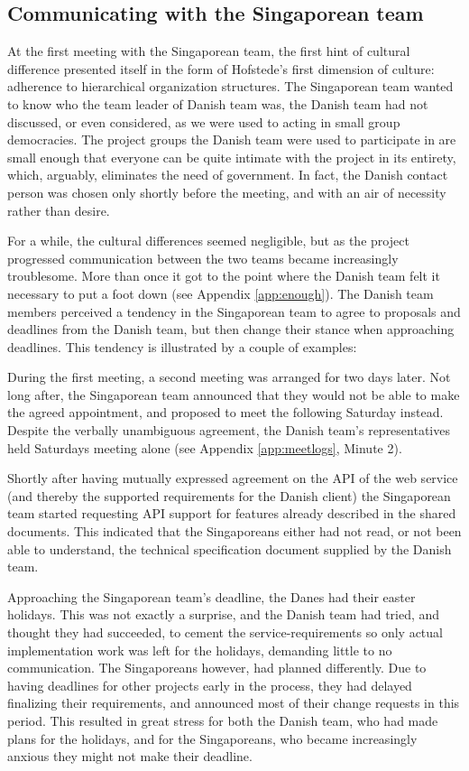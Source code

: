 \subsection{Communicating with the Singaporean team}
\label{sec:communicating}

At the first meeting with the Singaporean team, the first hint of
cultural difference presented itself in the form of Hofstede's first dimension
of culture: adherence to hierarchical organization structures\cite{surprises}.
The Singaporean team wanted to know who the team leader of Danish team was,
the Danish team had not discussed, or even considered, as
we were used to acting in small group democracies. The
project groups the Danish team were used to participate in are small enough
that everyone can be quite intimate with the project in its entirety, which,
arguably, eliminates the need of government. In fact, the Danish contact
person was chosen only shortly before the meeting, and with an air of necessity
rather than desire.

For a while, the cultural differences seemed negligible, but as the project
progressed communication between the two teams became increasingly troublesome.
More than once it got to the point where the Danish team felt it necessary to
put a foot down (see Appendix \ref{app:enough}). The Danish team members perceived a tendency
in the Singaporean team to agree to
proposals and deadlines from the Danish team, but then change their stance when
approaching deadlines. This tendency is illustrated by a couple of examples:

During the first meeting, a second meeting was arranged for two days later. Not
long after, the Singaporean team announced that they would not be able to make
the agreed appointment, and proposed to meet the following Saturday instead.
Despite the verbally unambiguous agreement, the Danish team's
representatives held Saturdays meeting alone (see Appendix \ref{app:meetlogs},
Minute 2).

Shortly after having mutually expressed
agreement on the API of the web service (and thereby the supported requirements
for the Danish client) the Singaporean team started requesting API support for
features already described in the shared documents.
This indicated that the Singaporeans either had not read, or not been able to
understand, the technical specification document supplied by the Danish team.

Approaching the Singaporean team's deadline, the Danes had their easter
holidays. This was not exactly a surprise, and the Danish team had tried, and
thought they had succeeded, to cement the service-requirements so only actual
implementation work was left for the holidays, demanding little to no
communication. The Singaporeans however, had planned differently. Due to having
deadlines for other projects early in the process, they had delayed finalizing
their requirements, and announced most of their change requests in this period.
This resulted in great stress for both the Danish team, who had made plans for
the holidays, and for the Singaporeans, who became increasingly anxious they
might not make their deadline.

